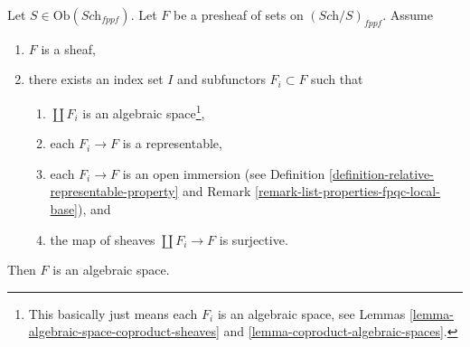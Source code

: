 \begin{lemma}
\label{lemma-glueing-algebraic-spaces}
Let $S \in \text{Ob}(\textit{Sch}_{fppf})$.
Let $F$ be a presheaf of sets on $(\textit{Sch}/S)_{fppf}$.
Assume
\begin{enumerate}
\item $F$ is a sheaf,
\item there exists an index set $I$
and subfunctors $F_i \subset F$ such that
\begin{enumerate}
\item $\coprod F_i$ is an algebraic space\footnote{
This basically just means each $F_i$ is an algebraic space, see
Lemmas \ref{lemma-algebraic-space-coproduct-sheaves}
and \ref{lemma-coproduct-algebraic-spaces}.},
\item each $F_i \to F$ is a representable,
\item each $F_i \to F$ is an open immersion (see
Definition \ref{definition-relative-representable-property} and
Remark \ref{remark-list-properties-fpqc-local-base}),
and
\item the map of sheaves $\coprod F_i \to F$ is surjective.
\end{enumerate}
\end{enumerate}
Then $F$ is an algebraic space.
\end{lemma}

